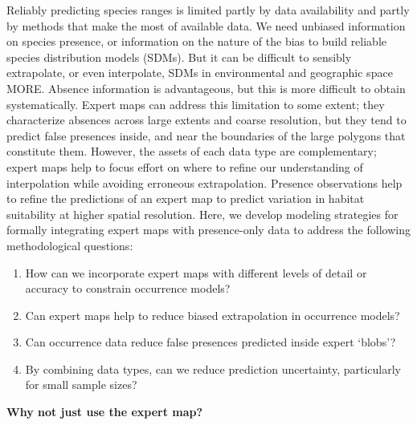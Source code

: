 Reliably predicting species ranges is limited partly by data availability and partly by methods that make the most of available data. We need unbiased information on species presence, or information on the nature of the bias to build reliable species distribution models (SDMs). But it can be difficult to sensibly extrapolate, or even interpolate, SDMs in environmental and geographic space \citep{Merow:2014hw} MORE.  Absence information is advantageous, but this is more difficult to obtain systematically. Expert maps can address this limitation to some extent; they characterize absences across large extents and coarse resolution, but they tend to predict false presences inside, and near the boundaries of the large polygons that constitute them. However, the assets of each data type are complementary; expert maps help to focus effort on where to refine our understanding of interpolation while avoiding erroneous extrapolation. Presence observations help to refine the predictions of an expert map to predict variation in habitat suitability at higher spatial resolution. Here, we develop modeling strategies for formally integrating expert maps with presence-only data to address the following methodological questions:
\begin{enumerate}
  \item How can we incorporate expert maps with different levels of detail or accuracy to constrain occurrence models?  
  \item Can expert maps help to reduce biased extrapolation in occurrence models?
  \item Can occurrence data reduce false presences predicted inside expert `blobs'?
  \item By combining data types, can we reduce prediction uncertainty, particularly for small sample sizes?
\end{enumerate}


\textbf{Why not just use the expert map?} 

